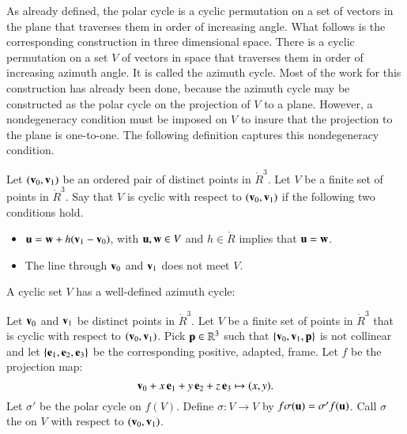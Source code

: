 As already defined, the polar cycle is a cyclic permutation on a set
of vectors in the plane that traverses them in order of increasing
angle.  What follows is the corresponding construction in three dimensional
space.  There is  a cyclic permutation on a set $V$ of vectors in space
that traverses them in order of increasing azimuth angle.  It is called 
the azimuth cycle.  Most of the work for this construction has already been done, because the azimuth cycle may be constructed as the polar cycle on the projection of $V$ to a plane.  However, 
a nondegeneracy condition must be imposed on $V$ to insure that
the projection to the plane is one-to-one.  The following
definition captures this nondegeneracy condition.
%
%
%
%


\begin{definition} Let $({\mathbf v}_0,{\mathbf v}_1)$ be an ordered pair of distinct points in
$\ring{R}^3$.
Let $V$ be a finite set of points in $\ring{R}^3$.
Say that $V$ is cyclic with respect to $({\mathbf v}_0,{\mathbf v}_1)$ if
the following two conditions hold.
\begin{itemize}
\item ${\mathbf u} = {\mathbf w} + h ({\mathbf v}_1-{\mathbf v}_0)$, with ${\mathbf u},{\mathbf w}\in V$ and $h\in \ring{R}$
implies that ${\mathbf u}={\mathbf w}$.  
\item  The line through ${\mathbf v}_0$ and ${\mathbf v}_1$ does not meet $V$.
\end{itemize}
\end{definition}
%

A cyclic set $V$ has a well-defined azimuth cycle:

\begin{definition}
Let ${\mathbf v}_0$ and ${\mathbf v}_1$ be distinct points in
$\ring{R}^3$.
Let $V$ be a finite set of points in $\ring{R}^3$ that is
cyclic  with respect to $({\mathbf v}_0,{\mathbf v}_1)$.  Pick ${\mathbf p}\in\mathbb{R}^3$ 
such that $\{{\mathbf v}_0,{\mathbf v}_1,{\mathbf p}\}$ is not collinear and let $\{{\mathbf e}_1,{\mathbf e}_2,{\mathbf e}_3\}$ be the corresponding positive, adapted, frame.
Let $f$ be the projection map:
   $${\mathbf v}_0 + x\, {\mathbf e}_1 + y\, {\mathbf e}_2 + z\, {\mathbf e}_3 \mapsto
     (x,y).$$
Let $\sigma'$ be the polar cycle on $f(V)$. Define 
$\sigma:V\to V$ by $f\sigma({\mathbf u}) =\sigma'f({\mathbf u})$.
Call $\sigma$ the 
on $V$ with respect to $({\mathbf v}_0,{\mathbf v}_1)$.
%
%
%
%
%
\end{definition}

